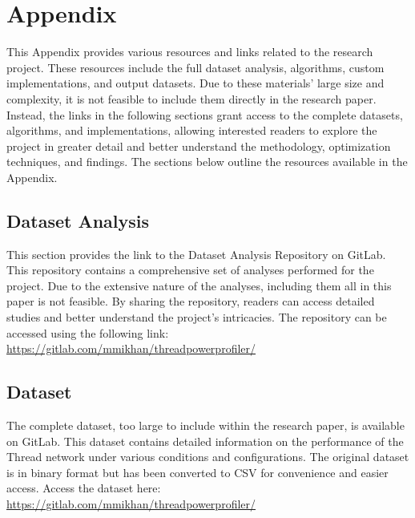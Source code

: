 \chapter*{Appendix}\label{appendix}




\appendix
This Appendix provides various resources and links related to the research project. These resources include the full dataset analysis, algorithms, custom implementations, and output datasets. Due to these materials' large size and complexity, it is not feasible to include them directly in the research paper. Instead, the links in the following sections grant access to the complete datasets, algorithms, and implementations, allowing interested readers to explore the project in greater detail and better understand the methodology, optimization techniques, and findings. The sections below outline the resources available in the Appendix.

\section{Dataset Analysis}
This section provides the link to the Dataset Analysis Repository on GitLab. This repository contains a comprehensive set of analyses performed for the project. Due to the extensive nature of the analyses, including them all in this paper is not feasible. By sharing the repository, readers can access detailed studies and better understand the project's intricacies. The repository can be accessed using the following link: \url{https://gitlab.com/mmikhan/threadpowerprofiler/}

\section{Dataset}
The complete dataset, too large to include within the research paper, is available on GitLab. This dataset contains detailed information on the performance of the Thread network under various conditions and configurations. The original dataset is in binary format but has been converted to CSV for convenience and easier access. Access the dataset here: \url{https://gitlab.com/mmikhan/threadpowerprofiler/}

